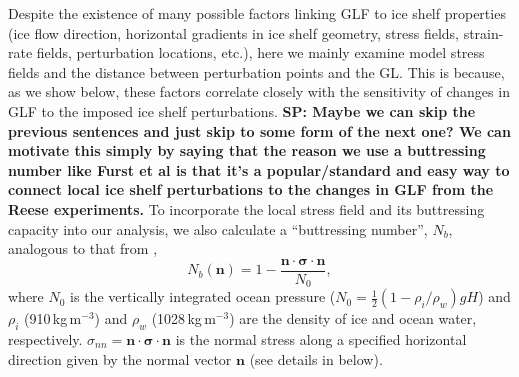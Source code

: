 \documentclass[review,oneside]{igs}
\begin{document}
Despite the existence of many possible factors linking GLF to ice shelf properties (ice flow direction, horizontal gradients in ice shelf geometry, stress fields, strain-rate fields, perturbation locations, etc.), here we mainly examine model stress fields and the distance between perturbation points and the GL. This is because, as we show below, these factors correlate closely with the sensitivity of changes in GLF to the imposed ice shelf perturbations. \textbf{SP: Maybe we can skip the previous sentences and just skip to some form of the next one? We can motivate this simply by saying that the reason we use a buttressing number like Furst et al is that it's a popular/standard and easy way to connect local ice shelf perturbations to the changes in GLF from the Reese experiments.} To incorporate the local stress field and its buttressing capacity into our analysis, we also calculate a ``buttressing number'', $N_b$, analogous to that from \citet{furst2016},
\begin{equation}
N_b\left(\mathbf{n}\right)=1-\frac{\mathbf{n}\cdot\mathbf{\sigma}\cdot\mathbf{n}}{N_0},
\label{butN}
\end{equation}
where $N_0$ is the vertically integrated ocean pressure ($N_0=\frac{1}{2}\left(1-{\rho_i}/{\rho_w}\right)gH$) and $\rho_i$ (910\,kg\,m$^{-3}$) and $\rho_w$ (1028\,kg\,m$^{-3}$) are the density of ice and ocean water, respectively. $\sigma_{nn}=\mathbf{n}\cdot\mathbf{\sigma}\cdot\mathbf{n}$ is the normal stress along a specified horizontal direction given by the normal vector $\mathbf{n}$ (see details in below).

%
\end{document}
